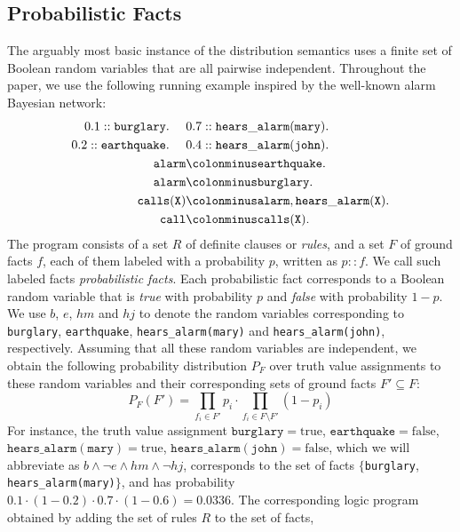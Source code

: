 \documentclass[a4paper]{article}
\newcommand{\true}{\ensuremath{\mathrm{true}}}
\newcommand{\false}{\ensuremath{\mathrm{false}}}
\begin{document}
\subsection{Probabilistic Facts}
The arguably most basic instance of the distribution semantics uses a
finite set of Boolean random variables that are all pairwise
independent. Throughout the paper, we use the following running example inspired
by the well-known alarm Bayesian network: 
\begin{align}
0.1::\mathtt{burglary.} ~~~~&0.7::\mathtt{hears\_alarm(mary).} \nonumber\\
0.2::\mathtt{earthquake.} ~~~~&0.4::\mathtt{hears\_alarm(john).}\nonumber\\
\mathtt{alarm}&\colonminus\mathtt{earthquake.}\label{ex:alarm}\\
\mathtt{alarm}&\colonminus\mathtt{burglary.}\nonumber\\
\mathtt{calls(X)}&\colonminus\mathtt{alarm, hears\_alarm(X).}\nonumber\\
\mathtt{call}&\colonminus\mathtt{calls(X).}\nonumber
\end{align}\label{page:alarm}
The program consists of a set $R$ of definite clauses or \emph{rules},
and a set $F$ of ground facts $f$, each of them
labeled with a probability $p$, written as $p::f$. We call such
labeled facts \emph{probabilistic facts}. Each probabilistic fact
corresponds to a Boolean random
variable that is \emph{true} with probability $p$ and \emph{false} with
probability $1-p$. We use $b$, $e$, $hm$ and $hj$ to denote the random
variables corresponding to \verb|burglary|, \verb|earthquake|,
\verb|hears_alarm(mary)| and \verb|hears_alarm(john)|, respectively. 
Assuming that all these random variables are
independent, we obtain the following probability distribution $P_F$
over truth value assignments to these random variables and their
corresponding  sets
of ground facts $F'\subseteq F$:
\begin{equation}
\label{eq:p_f}
P_F(F') = \prod_{f_i\in F'}p_i\cdot\prod_{f_i\in F\setminus F'}(1-p_i)
\end{equation}
For instance, the truth value assignment $\mathtt{burglary}=\true$,
$\mathtt{earthquake}=\false$, $\mathtt{hears\_alarm(mary)}=\true$, $\mathtt{hears\_alarm(john)}=\false$, which we will abbreviate as $b\wedge \neg e\wedge
hm\wedge\neg hj$, corresponds to the set of facts $\{$\verb|burglary|,
\verb|hears_alarm(mary)|$\}$, and has probability $0.1\cdot
(1-0.2)\cdot 0.7 \cdot (1-0.6) = 0.0336$. The corresponding logic
program obtained by adding the set of rules $R$ to the set of facts,
\end{document}
